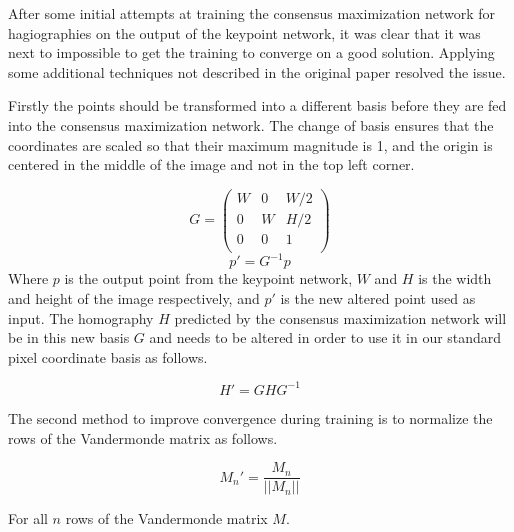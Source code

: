 After some initial attempts at training the consensus maximization network for hagiographies on the output of the keypoint network, it was clear that it was next to impossible to get the training to converge on a good solution. Applying some additional techniques not described in the original paper resolved the issue.

Firstly the points should be transformed into a different basis before they are fed into the consensus maximization network. The change of basis ensures that the coordinates are scaled so that their maximum magnitude is 1, and the origin is centered in the middle of the image and not in the top left corner.

\[
G=
\begin{pmatrix}
W & 0 & W/2 \\
0 & W & H/2 \\
0 & 0 & 1 \\
\end{pmatrix}
\]
\[
p' = G^{-1} p
\]
Where $p$ is the output point from the keypoint network, $W$ and $H$ is the width and height of the image respectively, and $p'$ is the new altered point used as input. The homography $H$ predicted by the consensus maximization network will be in this new basis $G$ and needs to be altered in order to use it in our standard pixel coordinate basis as follows.

\[
H' = G H G^{-1}
\]

The second method to improve convergence during training is to normalize the rows of the Vandermonde matrix as follows.

\[
M_n' = \frac{M_n}{||M_n||}
\]

For all $n$ rows of the Vandermonde matrix $M$.





